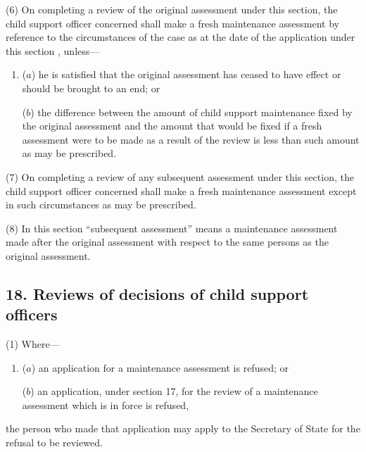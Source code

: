 \documentclass[12pt,a4paper]{article}
\begin{document}
(6) On completing 
a review of the original assessment  %
under this section, the child support officer concerned shall make a fresh maintenance assessment
by reference to the circumstances of the case as at the date of the application under this section%
, unless—
\begin{enumerate}\item[]
($a$) he is satisfied that the original assessment has ceased to have effect or should be brought to an end; or

($b$) the difference between the amount of child support maintenance fixed by the original assessment and the amount that would be fixed if a fresh assessment were to be made as a result of the review is less than such amount as may be prescribed.
\end{enumerate}

(7) On completing a review of any subsequent assessment under this section, the child support officer concerned shall make a fresh maintenance assessment except in such circumstances as may be prescribed.

(8) In this section “subsequent assessment” means a maintenance assessment made after the original assessment with respect to the same persons as the original assessment.


\subsection{18. Reviews of decisions of child support officers}

(1) Where—
\begin{enumerate}\item[]
($a$) an application for a maintenance assessment is refused; or

($b$) an application, under section 17, for the review of a maintenance assessment which is in force is refused,
\end{enumerate}
the person who made that application may apply to the Secretary of State for the refusal to be reviewed.
\end{document}
